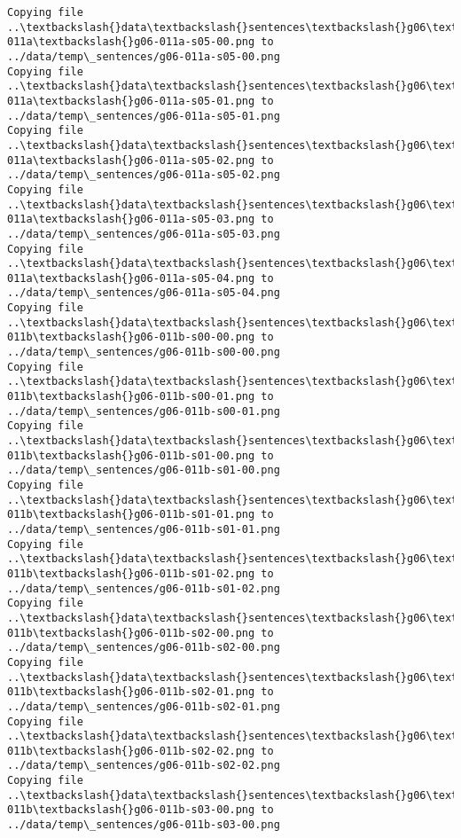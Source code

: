 \documentclass[11pt]{article}
\begin{document}
\begin{Verbatim}[commandchars=\\\{\}]
Copying file ..\textbackslash{}data\textbackslash{}sentences\textbackslash{}g06\textbackslash{}g06-011a\textbackslash{}g06-011a-s05-00.png to
../data/temp\_sentences/g06-011a-s05-00.png
Copying file ..\textbackslash{}data\textbackslash{}sentences\textbackslash{}g06\textbackslash{}g06-011a\textbackslash{}g06-011a-s05-01.png to
../data/temp\_sentences/g06-011a-s05-01.png
Copying file ..\textbackslash{}data\textbackslash{}sentences\textbackslash{}g06\textbackslash{}g06-011a\textbackslash{}g06-011a-s05-02.png to
../data/temp\_sentences/g06-011a-s05-02.png
Copying file ..\textbackslash{}data\textbackslash{}sentences\textbackslash{}g06\textbackslash{}g06-011a\textbackslash{}g06-011a-s05-03.png to
../data/temp\_sentences/g06-011a-s05-03.png
Copying file ..\textbackslash{}data\textbackslash{}sentences\textbackslash{}g06\textbackslash{}g06-011a\textbackslash{}g06-011a-s05-04.png to
../data/temp\_sentences/g06-011a-s05-04.png
Copying file ..\textbackslash{}data\textbackslash{}sentences\textbackslash{}g06\textbackslash{}g06-011b\textbackslash{}g06-011b-s00-00.png to
../data/temp\_sentences/g06-011b-s00-00.png
Copying file ..\textbackslash{}data\textbackslash{}sentences\textbackslash{}g06\textbackslash{}g06-011b\textbackslash{}g06-011b-s00-01.png to
../data/temp\_sentences/g06-011b-s00-01.png
Copying file ..\textbackslash{}data\textbackslash{}sentences\textbackslash{}g06\textbackslash{}g06-011b\textbackslash{}g06-011b-s01-00.png to
../data/temp\_sentences/g06-011b-s01-00.png
Copying file ..\textbackslash{}data\textbackslash{}sentences\textbackslash{}g06\textbackslash{}g06-011b\textbackslash{}g06-011b-s01-01.png to
../data/temp\_sentences/g06-011b-s01-01.png
Copying file ..\textbackslash{}data\textbackslash{}sentences\textbackslash{}g06\textbackslash{}g06-011b\textbackslash{}g06-011b-s01-02.png to
../data/temp\_sentences/g06-011b-s01-02.png
Copying file ..\textbackslash{}data\textbackslash{}sentences\textbackslash{}g06\textbackslash{}g06-011b\textbackslash{}g06-011b-s02-00.png to
../data/temp\_sentences/g06-011b-s02-00.png
Copying file ..\textbackslash{}data\textbackslash{}sentences\textbackslash{}g06\textbackslash{}g06-011b\textbackslash{}g06-011b-s02-01.png to
../data/temp\_sentences/g06-011b-s02-01.png
Copying file ..\textbackslash{}data\textbackslash{}sentences\textbackslash{}g06\textbackslash{}g06-011b\textbackslash{}g06-011b-s02-02.png to
../data/temp\_sentences/g06-011b-s02-02.png
Copying file ..\textbackslash{}data\textbackslash{}sentences\textbackslash{}g06\textbackslash{}g06-011b\textbackslash{}g06-011b-s03-00.png to
../data/temp\_sentences/g06-011b-s03-00.png

\end{Verbatim}
\end{document}
